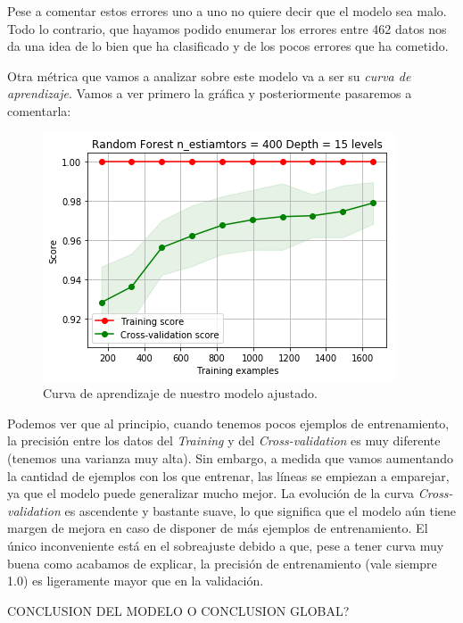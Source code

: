 \documentclass[11pt,a4paper]{article}
\begin{document}
Pese a comentar estos errores uno a uno no quiere decir que el modelo sea malo. Todo lo contrario, que hayamos podido enumerar los errores entre 462 datos nos da una idea de lo bien que ha clasificado y de los pocos errores que ha cometido.

Otra métrica que vamos a analizar sobre este modelo va a ser su \textit{curva de aprendizaje}. Vamos a ver primero la gráfica y posteriormente pasaremos a comentarla:

\begin{figure}[H]
    \centering
    \includegraphics[scale=0.75]{img/lc-rf.png}
    \caption{Curva de aprendizaje de nuestro modelo ajustado.}
    \label{fig:lc-rf}
\end{figure}

Podemos ver que al principio, cuando tenemos pocos ejemplos de entrenamiento, la precisión entre los datos del \textit{Training} y del
\textit{Cross-validation} es muy diferente (tenemos una varianza muy alta). Sin embargo, a medida que vamos aumentando la cantidad de
ejemplos con los que entrenar, las líneas se empiezan a emparejar, ya que el modelo puede generalizar mucho mejor. La evolución de la curva
\textit{Cross-validation} es ascendente y bastante suave, lo que significa que el modelo aún tiene margen de mejora en caso de disponer de
más ejemplos de entrenamiento. El único inconveniente está en el sobreajuste debido a que, pese a tener curva muy buena como acabamos de explicar, la precisión de entrenamiento (vale siempre 1.0) es ligeramente mayor que en la validación.

CONCLUSION DEL MODELO O CONCLUSION GLOBAL?

\newpage
\end{document}
